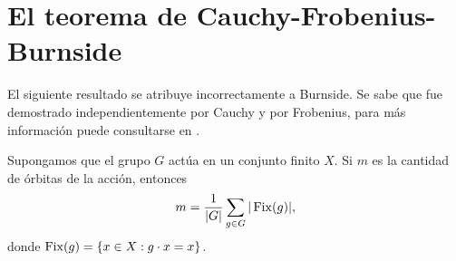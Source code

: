 \chapter{El teorema de Cauchy-Frobenius-Burnside}

El siguiente resultado se atribuye incorrectamente a Burnside. Se sabe que fue
demostrado independientemente por Cauchy y por Frobenius, para más información
puede consultarse en \cite{MR562002}.
    
\begin{theorem}
    Supongamos que el grupo $G$ actúa en un conjunto finito $X$. 
    Si $m$ es la cantidad de órbitas de la acción,
    entonces
    \[
    m=\frac{1}{|G|}\sum_{g\in G}|\operatorname{Fix}(g)|,
    \]
    donde $\operatorname{Fix}(g)=\{x\in X:g\cdot x=x\}$.
\end{theorem}
    
